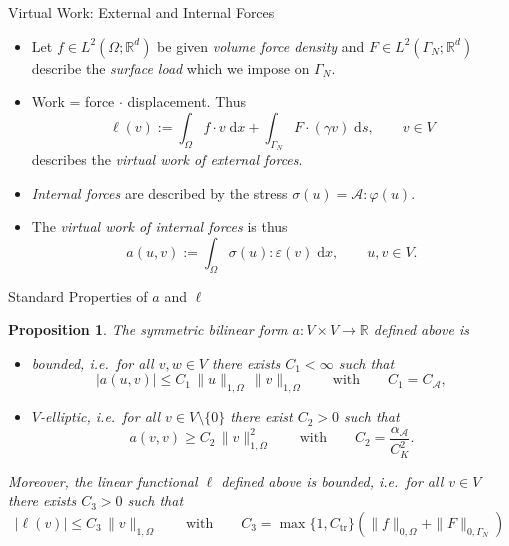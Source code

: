 \documentclass[10pt,aspectratio=169]{beamer}
\newtheorem{proposition}{Proposition}[section]
\def\R{{\mathbb R}}
\def\cA{{\mathcal A}}
\def\d{{\mathrm{d}}}
\def\dx{{\d x}}
\def\ds{{\d s}}
\begin{document}
\begin{frame}{Virtual Work: External and Internal Forces}
	\begin{itemize}
		\item Let $f\in L^2(\Omega;\R^d)$ be given {\em volume force density} and $F\in L^2(\Gamma_N;\R^d)$ describe the {\em surface load} which we impose on $\Gamma_N$.
		\item Work = force $\cdot$ displacement. Thus
		      \begin{equation*}
			      \ell(v)
			      :=
			      \int_\Omega f\cdot v\;\dx
			      +
			      \int_{\Gamma_N} F\cdot (\gamma v)\;\ds,\qquad v\in V
		      \end{equation*}
		      describes the {\em virtual work of external forces}.
		\item {\em Internal forces} are described by the stress $\sigma(u) = \cA:\varphi(u)$.
		\item The {\em virtual work of internal forces} is thus
		      \begin{equation*}
			      a(u,v)
			      :=
			      \int_\Omega \sigma(u):\varepsilon(v)\;\dx,\qquad u,v\in V.
		      \end{equation*}
	\end{itemize}
\end{frame}

\begin{frame}{Standard Properties of $a$ and $\ell$}
	\begin{proposition}
		The symmetric bilinear form $a:V\times V\to \R$ defined above is
		\begin{itemize}
			\item[i)] {\em bounded}, i.e.\ for all $v,w\in V$ there exists $C_1<\infty$ such that
			      \begin{equation*}
				      |a(u,v)|\le C_1\,\|u\|_{1,\Omega}\,\|v\|_{1,\Omega}\qquad \text{with}\qquad C_1 = C_\cA,
			      \end{equation*}
			\item[ii)] $V${\em -elliptic}, i.e.\ for all $v\in V\setminus\{0\}$ there exist $C_2>0$ such that
			      \begin{equation*}
				      a(v,v)\ge C_2\,\|v\|_{1,\Omega}^2\qquad\text{with}\qquad C_2 = \frac{\alpha_\cA}{C_K^2}.
			      \end{equation*}
		\end{itemize}
		Moreover, the linear functional $\ell$ defined above is {\em bounded}, i.e.\ for all $v\in V$ there exists $C_3>0$ such that
		\begin{equation*}
			|\ell (v)|\le C_3\,\|v\|_{1,\Omega}\qquad\text{with}\qquad C_3 = \max\{1,C_\mathrm{tr}\}\left(\|f\|_{0,\Omega}+\|F\|_{0,\Gamma_N}\right)
		\end{equation*}
	\end{proposition}
\end{frame}
\end{document}
